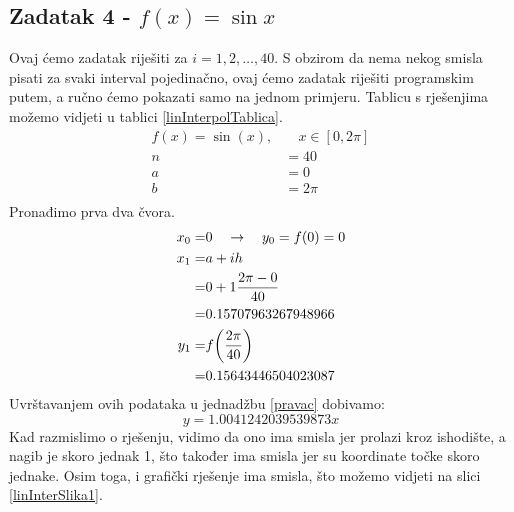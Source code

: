 \documentclass[12pt,a4paper]{report}
\begin{document}
		\subsection{Zadatak 4 - $f(x)=\sin x$}
			Ovaj ćemo zadatak riješiti za $i=1, 2,\ldots, 40$. S obzirom da nema nekog smisla pisati za svaki interval pojedinačno, ovaj ćemo zadatak riješiti programskim putem, a ručno ćemo pokazati samo na jednom primjeru. Tablicu s rješenjima možemo vidjeti u tablici \ref{linInterpolTablica}.
			\begin{align*}
				f(x)=\sin (x),& \quad x\in [0, 2\pi]\\
				n&=40\\
				a&=0\\
				b&=2\pi\\
			\end{align*}
			Pronađimo prva dva čvora. %
%	
%	
			\begin{align*}
				x_0=&0\quad\rightarrow \quad y_0=f(0)=0\\
				x_1=&a+ih\\=&0+1\frac{2\pi-0}{40}\\
					=&0.15707963267948966\\
				y_1=&f\biggr{(}\frac{2\pi}{40}\biggr{)}\\=&0.15643446504023087
			\end{align*}
			Uvrštavanjem ovih podataka u jednadžbu \ref{pravac} dobivamo:
			\begin{equation}
				y=1.0041242039539873x
				\label{linInt1}
			\end{equation}
			Kad razmislimo o rješenju, vidimo da ono ima smisla jer prolazi kroz ishodište, a nagib je skoro jednak 1, što također ima smisla jer su koordinate točke skoro jednake. Osim toga, i grafički rješenje ima smisla, što možemo vidjeti na slici \ref{linInterSlika1}.
\end{document}
